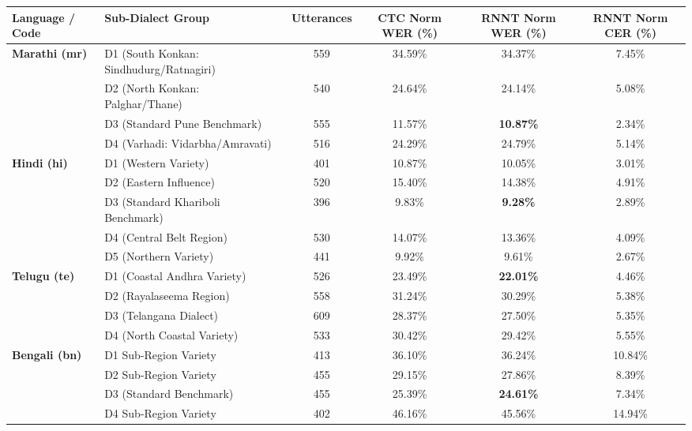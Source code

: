 \documentclass[10pt]{article}
\begin{document}
\begin{table}[h!]
\centering
\small
\setlength{\tabcolsep}{4pt}
\begin{tabular}{llcccc}
\toprule
\textbf{Language / Code} & \textbf{Sub-Dialect Group} & \textbf{Utterances} & \textbf{CTC Norm WER (\%)} & \textbf{RNNT Norm WER (\%)} & \textbf{RNNT Norm CER (\%)} \\
\midrule
\multirow{4}{*}{\textbf{Marathi (mr)}} 
 & D1 (South Konkan: Sindhudurg/Ratnagiri) & 559 & 34.59\% & 34.37\% & 7.45\% \\
 & D2 (North Konkan: Palghar/Thane)       & 540 & 24.64\% & 24.14\% & 5.08\% \\
 & D3 (Standard Pune Benchmark)            & 555 & 11.57\% & \textbf{10.87\%} & 2.34\% \\
 & D4 (Varhadi: Vidarbha/Amravati)        & 516 & 24.29\% & 24.79\% & 5.14\% \\
\midrule
\multirow{5}{*}{\textbf{Hindi (hi)}} 
 & D1 (Western Variety)                   & 401 & 10.87\% & 10.05\% & 3.01\% \\
 & D2 (Eastern Influence)                 & 520 & 15.40\% & 14.38\% & 4.91\% \\
 & D3 (Standard Khariboli Benchmark)      & 396 & 9.83\%  & \textbf{9.28\%}  & 2.89\% \\
 & D4 (Central Belt Region)               & 530 & 14.07\% & 13.36\% & 4.09\% \\
 & D5 (Northern Variety)                  & 441 & 9.92\%  & 9.61\%  & 2.67\% \\
\midrule
\multirow{4}{*}{\textbf{Telugu (te)}} 
 & D1 (Coastal Andhra Variety)            & 526 & 23.49\% & \textbf{22.01\%} & 4.46\% \\
 & D2 (Rayalaseema Region)                & 558 & 31.24\% & 30.29\% & 5.38\% \\
 & D3 (Telangana Dialect)                 & 609 & 28.37\% & 27.50\% & 5.35\% \\
 & D4 (North Coastal Variety)             & 533 & 30.42\% & 29.42\% & 5.55\% \\
\midrule
\multirow{5}{*}{\textbf{Bengali (bn)}} 
 & D1 Sub-Region Variety                  & 413 & 36.10\% & 36.24\% & 10.84\% \\
 & D2 Sub-Region Variety                  & 455 & 29.15\% & 27.86\% & 8.39\% \\
 & D3 (Standard Benchmark)                & 455 & 25.39\% & \textbf{24.61\%} & 7.34\% \\
 & D4 Sub-Region Variety                  & 402 & 46.16\% & 45.56\% & 14.94\% \\

\end{tabular}
\end{table}
\end{document}
